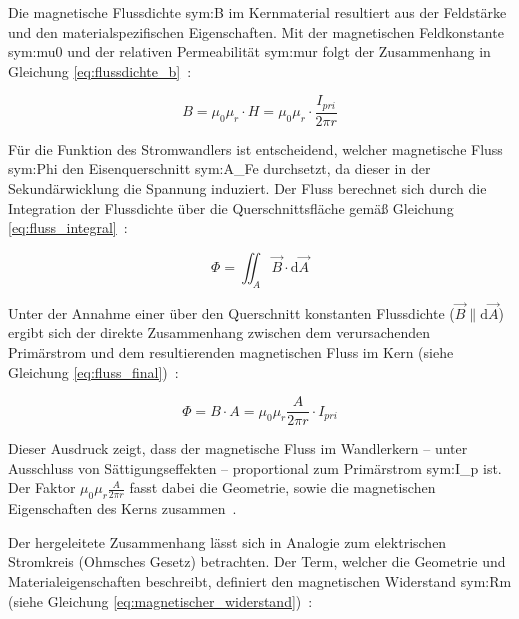 Die magnetische Flussdichte \gls{sym:B} im Kernmaterial resultiert aus der Feldstärke und den materialspezifischen Eigenschaften. Mit der magnetischen Feldkonstante \gls{sym:mu0} und der relativen Permeabilität \gls{sym:mur} folgt der Zusammenhang in Gleichung \eqref{eq:flussdichte_b}~\cite[Kap.~4.5.4]{book-Physik_Ingenieure-Hering}:

\begin{equation}
    B = \mu_0 \mu_r \cdot H = \mu_0 \mu_r \cdot \frac{I_{pri}}{2\pi r}
    \label{eq:flussdichte_b}
\end{equation}

Für die Funktion des Stromwandlers ist entscheidend, welcher magnetische Fluss \gls{sym:Phi} den Eisenquerschnitt \gls{sym:A_Fe} durchsetzt, da dieser in der Sekundärwicklung die Spannung induziert. Der Fluss berechnet sich durch die Integration der Flussdichte über die Querschnittsfläche gemäß Gleichung \eqref{eq:fluss_integral}~\cite[S.~67]{book-Technologie_Messwandler-Minkner}\cite[Kap.~4.5.4]{book-Physik_Ingenieure-Hering}:

\begin{equation}
    \Phi = \iint_A \vec{B} \cdot \mathrm{d}\vec{A}
    \label{eq:fluss_integral}
\end{equation}

Unter der Annahme einer über den Querschnitt konstanten Flussdichte ($\vec{B} \parallel \mathrm{d}\vec{A}$) ergibt sich der direkte Zusammenhang zwischen dem verursachenden Primärstrom und dem resultierenden magnetischen Fluss im Kern (siehe Gleichung \eqref{eq:fluss_final})~\cite[Kap.~4.5.4]{book-Physik_Ingenieure-Hering}:

\begin{equation}
    \Phi = B \cdot A = \mu_0 \mu_r \frac{A}{2\pi r} \cdot I_{pri}
    \label{eq:fluss_final}
\end{equation}

Dieser Ausdruck zeigt, dass der magnetische Fluss im Wandlerkern – unter Ausschluss von Sättigungseffekten – proportional zum Primärstrom \gls{sym:I_p} ist. Der Faktor $\mu_0 \mu_r \frac{A}{2\pi r}$ fasst dabei die Geometrie, sowie die magnetischen Eigenschaften des Kerns zusammen~\cite[Kap.~11]{book-Magnetisches_Feld_Moeller-Harriehausen}.

Der hergeleitete Zusammenhang lässt sich in Analogie zum elektrischen Stromkreis (Ohmsches Gesetz) betrachten. Der Term, welcher die Geometrie und Materialeigenschaften beschreibt, definiert den magnetischen Widerstand \gls{sym:Rm} (siehe Gleichung \eqref{eq:magnetischer_widerstand})~\cite[Kap.~11.9]{book-Magnetisches_Feld_Moeller-Harriehausen}:

